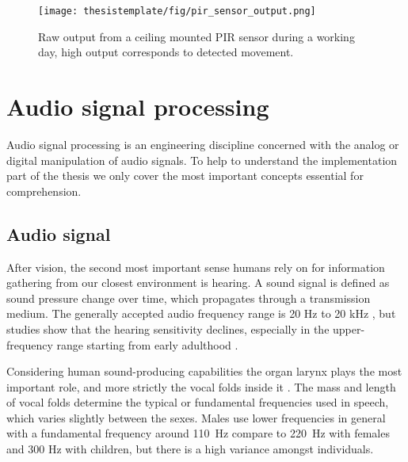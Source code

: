 \begin{figure}[ht!]
  \begin{center}
    \texttt{[image: thesistemplate/fig/pir\_sensor\_output.png]}
    \caption{Raw output from a ceiling mounted PIR sensor during a working day, high output corresponds to detected movement.}
    \label{fig:state_mach}
  \end{center}
\end{figure}



\section{Audio signal processing}

Audio signal processing is an engineering discipline concerned with the analog or digital manipulation of audio signals. To help to understand the implementation part of the thesis we only cover the most important concepts essential for comprehension.

\subsection{Audio signal}

After vision, the second most important sense humans rely on for information gathering from our closest environment is hearing. A sound signal is defined as sound pressure change over time, which propagates through a transmission medium. The generally accepted audio frequency range is 20 Hz to 20 kHz \cite{rosen2011signals_speech}, but studies show that the hearing sensitivity declines, especially in the upper-frequency range starting from early adulthood \cite{jilek2014hearing_loss}. 

Considering human sound-producing capabilities the organ larynx plays the most important role, and more strictly the vocal folds inside it \cite{rossing02the_science_of_sound}. The mass and length of vocal folds determine the typical or fundamental frequencies used in speech, which varies slightly between the sexes. Males use lower frequencies in general with a fundamental frequency around 110~Hz compare to 220~Hz with females and 300 Hz with children, but there is a high variance amongst individuals. \cite{rossing02the_science_of_sound} 

